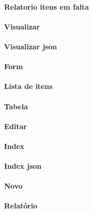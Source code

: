 \paragraph{Relatorio itens em falta}

\paragraph{Visualizar}

\paragraph{Visualizar json}



\paragraph{Form}

\paragraph{Lista de itens}

\paragraph{Tabela}

\paragraph{Editar}

\paragraph{Index}

\paragraph{Index json}

\paragraph{Novo}

\paragraph{Relatório}

